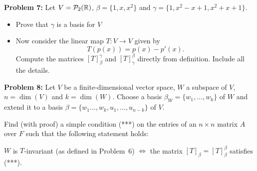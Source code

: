 \documentclass[11pt]{amsart}
\begin{document}
\skv


\noindent
{\bf Problem 7: } Let $V=\mathcal P_2({\mathbb R})$, $\beta=\{1,x,x^2\}$ and $\gamma=\{1,x^2-x+1, x^2+x+1\}$.
\begin{itemize}
\item[(a)] Prove that $\gamma$ is a basis for $V$
\item[(b)] Now consider the linear map $T:V\to V$ given by $$T(p(x))=p(x)-p'(x).$$ Compute the matrices
$[T]_{\beta}^{\gamma}$ and $[T]_{\gamma}^{\beta}$ directly from definition. Include all the details.
\end{itemize}
\skv
{\bf Problem 8: } Let $V$ be a finite-dimensional vector space, $W$ a subspace of $V$,
$n=\dim(V)$ and $k=\dim(W)$. Choose a basis $\beta_W=\{w_1,\ldots, w_k\}$ of $W$
and extend it to a basis $\beta=\{w_1\ldots, w_k, u_1,\ldots, u_{n-k}\}$ of $V$.

Find (with proof) a simple condition (***) on the entries of an $n\times n$ matrix $A$
over $F$ such that the following statement holds:

$W$ is $T$-invariant (as defined in Problem~6) $\iff$ the matrix $[T]_{\beta}=[T]_{\beta}^{\beta}$
satisfies (***).
\end{document}
